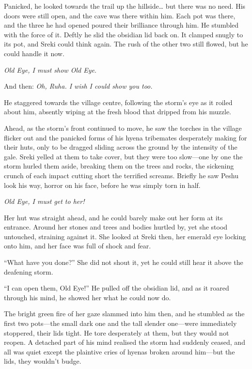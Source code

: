 Panicked, he looked towards the trail up the hillside\ldots{} but there was no need. His doors were still open, and the cave was there within him. Each pot was there, and the three he had opened poured their brilliance through him. He stumbled with the force of it. Deftly he slid the obsidian lid back on. It clamped snugly to its pot, and Sreki could think again. The rush of the other two still flowed, but he could handle it now.

\emph{Old Eye, I must show Old Eye.}

And then: \emph{Oh, Ruha. I wish I could show you too.}

He staggered towards the village centre, following the storm's eye as it roiled about him, absently wiping at the fresh blood that dripped from his muzzle.

Ahead, as the storm's front continued to move, he saw the torches in the village flicker out and the panicked forms of his hyena tribemates desperately making for their huts, only to be dragged sliding across the ground by the intensity of the gale. Sreki yelled at them to take cover, but they were too slow---one by one the storm hurled them aside, breaking them on the trees and rocks, the sickening crunch of each impact cutting short the terrified screams. Briefly he saw Peshu look his way, horror on his face, before he was simply torn in half.

\emph{Old Eye, I must get to her!}

Her hut was straight ahead, and he could barely make out her form at its entrance. Around her stones and trees and bodies hurtled by, yet she stood untouched, straining against it. She looked at Sreki then, her emerald eye locking onto him, and her face was full of shock and fear.

``What have you done?'' She did not shout it, yet he could still hear it above the deafening storm.

``I can open them, Old Eye!'' He pulled off the obsidian lid, and as it roared through his mind, he showed her what he could now do.

The bright green fire of her gaze slammed into him then, and he stumbled as the first two pots---the small dark one and the tall slender one---were immediately stoppered, their lids tight. He tore desperately at them, but they would not reopen. A detached part of his mind realised the storm had suddenly ceased, and all was quiet except the plaintive cries of hyenas broken around him---but the lids, they wouldn't budge.

